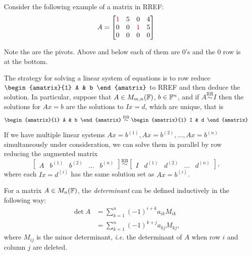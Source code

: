 \begin{example}
Consider the following example of a matrix in RREF:
$$A = 
\begin{bmatrix}
{\color{red} 1} & 5 & 0 & 4 \\
0 & 0 & {\color{red} 1} & 5 \\
0 & 0 & 0 & 0
\end{bmatrix}
$$

Note the  are the pivots. Above and below each of them are 0's and the 0 row is at the bottom.
\end{example}

\newpage

\noindent The strategy for solving a linear system of equations is to row reduce $\begin{amatrix}{1} A & b \end{amatrix}$ to RREF and then deduce the solution. In particular, suppose that $A \in M_{m,n}(\mathbb F)$, $b \in \mathbb F^n$, and if $A \overset{\text{RR}}{\sim} I$ then the solutions for $Ax = b$ are the solutions to $Ix = d$, which are unique, that is
$$
\begin{amatrix}{1} A & b \end{amatrix} \overset{\text{RR}}{\sim} \begin{amatrix}{1} I & d \end{amatrix}
$$

\noindent If we have multiple linear systems $Ax = b^{(1)}, Ax = b^{(2)}, \dots, Ax = b^{(n)}$ simultaneously under consideration, we can solve them in parallel by row reducing the augmented matrix
$$
\left[\begin{array}{c|c|c|c|c} A & b^{(1)} & b^{(2)} & \dots & b^{(n)} \end{array}\right]
\overset{\text{RR}}{\sim}
\left[\begin{array}{c|c|c|c|c} I & d^{(1)} & d^{(2)} & \dots & d^{(n)} \end{array}\right],
$$
where each $Ix = d^{(i)}$ has the same solution set as $Ax = b^{(i)}$.

\begin{definition}
For a matrix $A \in M_n(\mathbb F)$, the \textit{determinant} can be defined inductively in the following way:
\begin{align*}
    \det A &= \sum_{k=1}^n (-1)^{i+k}a_{ik}M_{ik} \\
           &= \sum_{k=1}^n (-1)^{k+j}a_{kj}M_{kj},
\end{align*}
where $M_{ij}$ is the minor determinant, \textit{i.e.} the determinant of $A$ when row $i$ and column $j$ are deleted.
\end{definition}


